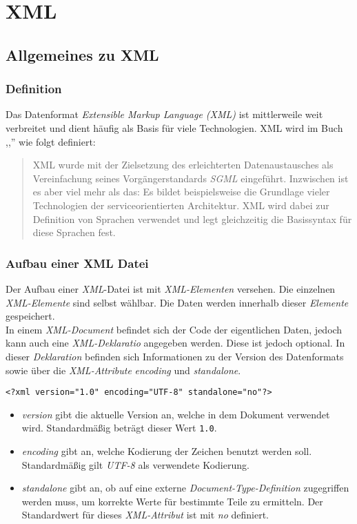 \section{XML}

\subsection{Allgemeines zu XML}
\pra
\subsubsection{Definition}
\noindent
Das Datenformat \textit{Extensible Markup Language (XML)} ist mittlerweile weit verbreitet und dient häufig als Basis für viele Technologien. XML wird im Buch ,,'' wie folgt definiert:

\begin{quote}
	XML wurde mit der Zielsetzung des erleichterten Datenaustausches als Vereinfachung seines Vorgängerstandards \textit{SGML} eingeführt. Inzwischen ist es aber viel mehr als das: Es bildet beispielsweise die Grundlage vieler Technologien der serviceorientierten Architektur. XML wird dabei zur Definition von Sprachen verwendet und legt gleichzeitig die Basissyntax für diese Sprachen fest.  
\end{quote}


\subsubsection{Aufbau einer XML Datei}
\pra
Der Aufbau einer \textit{XML}-Datei ist mit \textit{XML-Elementen} versehen. Die einzelnen \textit{XML-Elemente} sind selbst wählbar. Die Daten werden innerhalb dieser \textit{Elemente} gespeichert. 
\\

\noindent
In einem \textit{XML-Document} befindet sich der Code der eigentlichen Daten, jedoch kann auch eine \textit{XML-Deklaratio} angegeben werden. Diese ist jedoch optional. In dieser \textit{Deklaration} befinden sich Informationen zu der Version des Datenformats sowie über die \textit{XML-Attribute} \textit{encoding} und \textit{standalone}. \footnotemark[9]

\begin{verbatim} 
<?xml version="1.0" encoding="UTF-8" standalone="no"?>
\end{verbatim}

\noindent
\begin{itemize}
	\item{\textit{version}} gibt die aktuelle Version an, welche in dem Dokument verwendet wird. Standardmäßig beträgt dieser Wert \verb|1.0|.
	\item{\textit{encoding}} gibt an, welche Kodierung der Zeichen benutzt werden soll. Standardmäßig gilt \textit{UTF-8} als verwendete Kodierung.
	\item{\textit{standalone}} gibt an, ob auf eine externe \textit{Document-Type-Definition} zugegriffen werden muss, um korrekte Werte für bestimmte Teile zu ermitteln. Der Standardwert für dieses \textit{XML-Attribut} ist mit \textit{no} definiert.\footnotemark[9]
\end{itemize}

